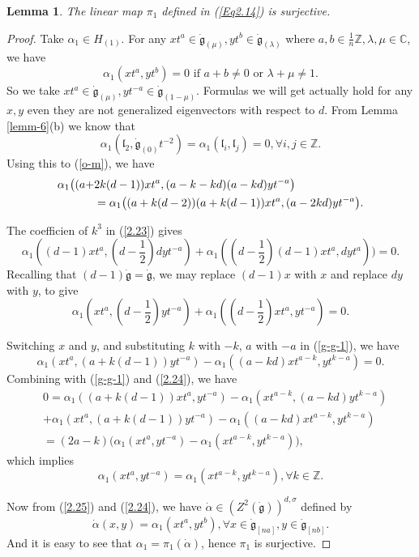 \documentclass[1p]{elsarticle}
\numberwithin{equation}{section}
\def\dg{\dot{\mathfrak{g}}}
\def\bC{\mathbb{C}}
\def\bZ{\mathbb{Z}}
\def\fl{\mathfrak{l}}
\newtheorem{lemm}[theo]{Lemma}
\begin{document}
 \begin{lemm}\label{lemm-11} The linear map $\pi_1$  defined in (\ref{Eq2.14}) is surjective.\end{lemm}


 \begin{proof} Take $\alpha_{1}\in H_{(1)}$.  For any $xt^a\in \dg_{(\mu)},yt^{b}\in \dg_{(\lambda)}
 	$ where $a, b\in\frac 1n\bZ, \lambda,\mu\in\bC$, we have
 	$$\alpha_{1}(xt^a,yt^b)=0\text{ if }a+b\ne0\text{ or }\lambda+\mu\ne 1.$$
 	So we take  $xt^a\in \dg_{(\mu)},yt^{-a}\in \dg_{(1-\mu)}$. Formulas we will get actually hold for any $x, y$ even they are not generalized eigenvectors with respect to $d$.  From Lemma \ref{lemm-6}(b) we know   that 
 	$$\alpha_{1}(\fl_2  ,\dg_{(0)}t^{-2})=\alpha_{1}(\fl_i  ,\fl_j)=0, \forall i,j\in \bZ.$$
 	Using this to  (\ref{o-m}), we have
 \begin{equation}\label{2.23}\aligned \alpha_{1}\big((a+&2k(d-1))xt^a,(a-k-kd)(a-kd)yt^{-a}\big)\\ &=\alpha_{1}\big((a+k(d-2))(a+k(d-1))xt^a,(a-2kd)yt^{-a}\big).\endaligned\end{equation}

The coefficien of $k^3$ in (\ref{2.23}) gives $$\alpha_1((d-1)xt^a, (d-\frac 12)dyt^{-a})+\alpha_1((d-\frac 12)(d-1)xt^a,dyt^a))=0.$$ Recalling that $(d-1)\dg=\dg$, we may replace $(d-1)x$ with $x$ and replace $dy$ with $y$, to give
\begin{equation}\label{2.24}\alpha_{1}(xt^a,(d-\frac 12)yt^{-a})+\alpha_{1}((d-\frac 12)xt^a,yt^{-a})=0.\end{equation}

Switching  $x$ and $y$, and substituting $k$ with $-k$, $a$ with $-a$ in (\ref{g-g-1}),  we have $$\alpha_1(xt^a, (a+k(d-1))yt^{-a})-\alpha_1((a-kd)x t^{a-k},yt^{k-a})=0.$$ Combining with (\ref{g-g-1}) and (\ref{2.24}), we have
$$\begin{aligned}&0=\alpha_1((a+k(d-1))xt^a,yt^{-a})-\alpha_1(xt^{a-k},(a-kd)yt^{k-a})\\&+\alpha_1(xt^a, (a+k(d-1))yt^{-a})-\alpha_1((a-kd)x t^{a-k},yt^{k-a})\\ &=(2a-k)
\Big(\alpha_1(xt^a,yt^{-a})-\alpha_1(xt^{a-k},yt^{k-a})\Big),\end{aligned}$$
which implies \begin{equation}\label{2.25}\alpha_1(xt^a,yt^{-a})=\alpha_1(xt^{a-k},yt^{k-a}),\forall k\in \bZ.\end{equation}

Now from (\ref{2.25}) and (\ref{2.24}), we have $\dot{\alpha}\in (Z^2(\dg))^{d,\sigma}$ defined by $$\dot{\alpha}(x,y)=\alpha_1(xt^a,yt^{b}),\forall x\in \dg_{[na]},y\in \dg_{[nb]}.$$ And it is easy to see that $\alpha_1=\pi_1(\dot\alpha)$, hence $\pi_1$ is surjective.
 \end{proof}
\end{document}
